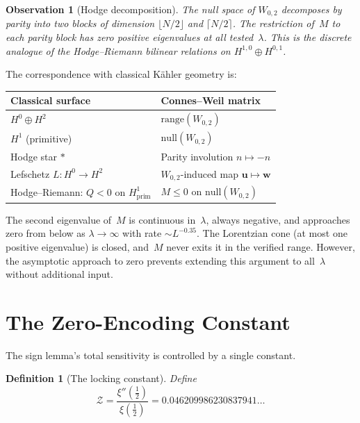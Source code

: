 \documentclass[11pt,a4paper]{article}
\newtheorem{observation}{Observation}[section]
\newtheorem{definition}{Definition}[section]
\begin{document}
\begin{observation}[Hodge decomposition]\label{obs:hodge}
The null space of $W_{0,2}$ decomposes by parity into two blocks of dimension $\lfloor N/2 \rfloor$ and $\lceil N/2 \rceil$. The restriction of~$M$ to \emph{each} parity block has zero positive eigenvalues at all tested~$\lambda$. This is the discrete analogue of the Hodge--Riemann bilinear relations on $H^{1,0} \oplus H^{0,1}$.
\end{observation}

The correspondence with classical K\"ahler geometry is:
\begin{center}
\begin{tabular}{ll}
\toprule
Classical surface & Connes--Weil matrix \\
\midrule
$H^0 \oplus H^2$ & $\mathrm{range}(W_{0,2})$ \\
$H^1$ (primitive) & $\mathrm{null}(W_{0,2})$ \\
Hodge star $\ast$ & Parity involution $n \mapsto -n$ \\
Lefschetz $L: H^0 \to H^2$ & $W_{0,2}$-induced map $\mathbf{u} \mapsto \mathbf{w}$ \\
Hodge--Riemann: $Q < 0$ on $H^1_{\mathrm{prim}}$ & $M \leq 0$ on $\mathrm{null}(W_{0,2})$ \\
\bottomrule
\end{tabular}
\end{center}

The second eigenvalue of~$M$ is continuous in~$\lambda$, always negative, and approaches zero from below as $\lambda \to \infty$ with rate $\sim L^{-0.35}$. The Lorentzian cone (at most one positive eigenvalue) is closed, and~$M$ never exits it in the verified range. However, the asymptotic approach to zero prevents extending this argument to all~$\lambda$ without additional input.

\section{The Zero-Encoding Constant}\label{sec:constant}

The sign lemma's total sensitivity is controlled by a single constant.

\begin{definition}[The locking constant]
Define
\begin{equation}\label{eq:Z}
\mathcal{Z} = \frac{\xi''(\tfrac{1}{2})}{\xi(\tfrac{1}{2})} = 0.046209986230837941\ldots
\end{equation}
\end{definition}
\end{document}
